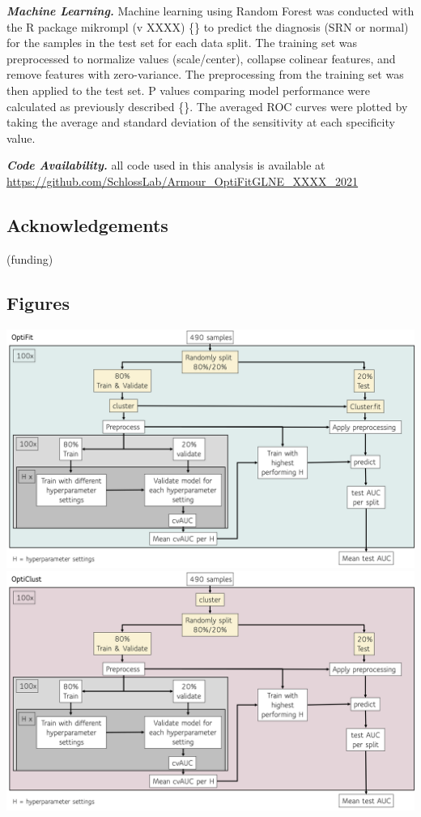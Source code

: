 \documentclass[
  11pt,
]{article}
\begin{document}
\textbf{\emph{Machine Learning.}} Machine learning using Random Forest
was conducted with the R package mikrompl (v XXXX) \{\} to predict the
diagnosis (SRN or normal) for the samples in the test set for each data
split. The training set was preprocessed to normalize values
(scale/center), collapse colinear features, and remove features with
zero-variance. The preprocessing from the training set was then applied
to the test set. P values comparing model performance were calculated as
previously described \{\}. The averaged ROC curves were plotted by
taking the average and standard deviation of the sensitivity at each
specificity value.

\textbf{\emph{Code Availability.}} all code used in this analysis is
available at
\url{https://github.com/SchlossLab/Armour_OptiFitGLNE_XXXX_2021}

\hypertarget{acknowledgements}{%
\subsection{Acknowledgements}\label{acknowledgements}}

(funding)

\newpage

\hypertarget{figures}{%
\subsection{Figures}\label{figures}}

\includegraphics{../exploratory/figures/figure1B.png}
\includegraphics{../exploratory/figures/figure1Apng.png}
\end{document}
